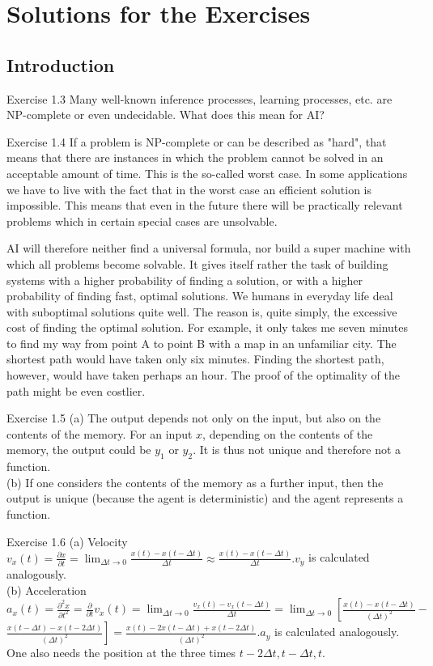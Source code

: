 \documentclass[10pt]{book}
\begin{document}
\chapter{Solutions for the Exercises}

\section{Introduction}
Exercise 1.3 Many well-known inference processes, learning processes, etc. are NP-complete or even undecidable. What does this mean for AI?


Exercise 1.4 If a problem is NP-complete or can be described as "hard", that means that there are instances in which the problem cannot be solved in an acceptable amount of time. This is the so-called worst case. In some applications we have to live with the fact that in the worst case an efficient solution is impossible. This means that even in the future there will be practically relevant problems which in certain special cases are unsolvable.

AI will therefore neither find a universal formula, nor build a super machine with which all problems become solvable. It gives itself rather the task of building systems with a higher probability of finding a solution, or with a higher probability of finding fast, optimal solutions. We humans in everyday life deal with suboptimal solutions quite well. The reason is, quite simply, the excessive cost of finding the optimal solution. For example, it only takes me seven minutes to find my way from point A to point B with a map in an unfamiliar city. The shortest path would have taken only six minutes. Finding the shortest path, however, would have taken perhaps an hour. The proof of the optimality of the path might be even costlier.

Exercise 1.5
(a) The output depends not only on the input, but also on the contents of the memory. For an input $x$, depending on the contents of the memory, the output could be $y_{1}$ or $y_{2}$. It is thus not unique and therefore not a function.\\
(b) If one considers the contents of the memory as a further input, then the output is unique (because the agent is deterministic) and the agent represents a function.

Exercise 1.6
(a) Velocity $v_{x}(t)=\frac{\partial x}{\partial t}=\lim _{\Delta t \rightarrow 0} \frac{x(t)-x(t-\Delta t)}{\Delta t} \approx \frac{x(t)-x(t-\Delta t)}{\Delta t} . v_{y}$ is calculated analogously.\\
(b) Acceleration $a_{x}(t)=\frac{\partial^{2} x}{\partial t^{2}}=\frac{\partial}{\partial t} v_{x}(t)=\lim _{\Delta t \rightarrow 0} \frac{v_{x}(t)-v_{x}(t-\Delta t)}{\Delta t}=\lim _{\Delta t \rightarrow 0}\left[\frac{x(t)-x(t-\Delta t)}{(\Delta t)^{2}}-\right.$ $\left.\frac{x(t-\Delta t)-x(t-2 \Delta t)}{(\Delta t)^{2}}\right]=\frac{x(t)-2 x(t-\Delta t)+x(t-2 \Delta t)}{(\Delta t)^{2}} . a_{y}$ is calculated analogously. One also needs the position at the three times $t-2 \Delta t, t-\Delta t, t$.
\end{document}

